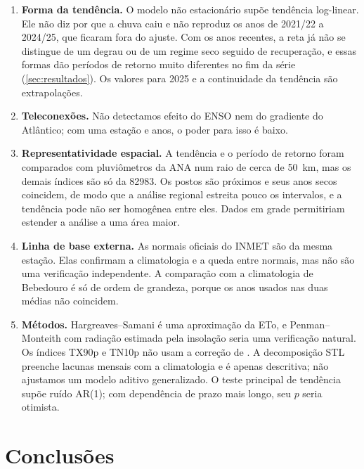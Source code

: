 \documentclass[11pt,a4paper]{article}
\newcommand{\Est}{82983}
\begin{document}
\begin{enumerate}
  a 2023/24 são chuvosos e ficam fora pelo critério de completude; incluí-los atenua a tendência
  de \SenChuva{} para \SenChuvaRecentes{}~mm por década. Se a recuperação continuar, a tendência de
  longo prazo será menor que a estimativa principal.
  \item \textbf{Forma da tendência.} O modelo não estacionário supõe tendência log-linear. Ele não
  diz por que a chuva caiu e não reproduz os anos de 2021/22 a 2024/25, que ficaram fora do ajuste.
  Com os anos recentes, a reta já não se distingue de um degrau ou de um regime seco seguido de
  recuperação, e essas formas dão períodos de retorno muito diferentes no fim da série
  (\cref{sec:resultados}). Os valores para 2025 e a continuidade da tendência são extrapolações.
  \item \textbf{Teleconexões.} Não detectamos efeito do ENSO nem do gradiente do Atlântico; com
  uma estação e \NanosValidos{} anos, o poder para isso é baixo.
  \item \textbf{Representatividade espacial.} A tendência e o período de retorno foram comparados
  com \NPostosAna{} pluviômetros da ANA num raio de cerca de 50~km, mas os demais índices são só da
  \Est{}. Os postos são próximos e seus anos secos coincidem, de modo que a análise regional estreita
  pouco os intervalos, e a tendência pode não ser homogênea entre eles. Dados em grade
  \parencite{xavier2016,funk2015} permitiriam estender a análise a uma área maior.
  \item \textbf{Linha de base externa.} As normais oficiais do INMET são da mesma estação.
  Elas confirmam a climatologia e a queda entre normais, mas não são uma verificação independente.
  A comparação com a climatologia de Bebedouro \parencite{teixeira2010} é só de ordem de grandeza,
  porque os anos usados nas duas médias não coincidem.
  \item \textbf{Métodos.} Hargreaves--Samani é uma aproximação da ETo, e Penman--Monteith com
  radiação estimada pela insolação seria uma verificação natural. Os índices TX90p e TN10p não
  usam a correção de \textcite{zhang2005}. A decomposição STL preenche lacunas mensais com a
  climatologia e é apenas descritiva; não ajustamos um modelo aditivo generalizado. O teste principal
  de tendência supõe ruído AR(1); com dependência de prazo mais longo, seu $p$ seria otimista.
\end{enumerate}

\section{Conclusões}\label{sec:conclusoes}
\end{document}
